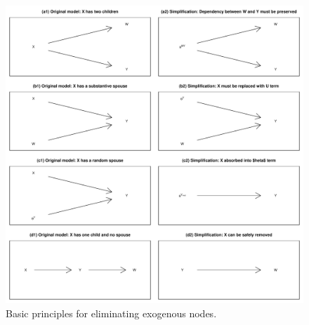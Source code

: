 \documentclass[
  12pt,
]{book}
\begin{document}
\begin{figure}

{\centering \includegraphics[width=.9\textwidth]{ii_files/figure-latex/elimrules-1} 

}

\caption{Basic principles for eliminating exogenous nodes.}\label{fig:elimrules}
\end{figure}
\end{document}
